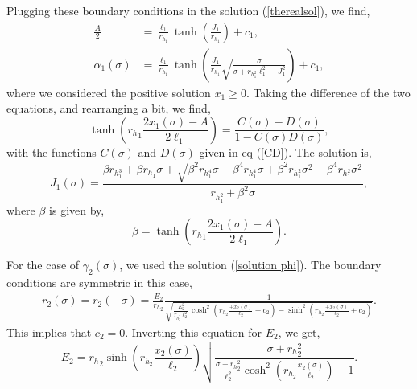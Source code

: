 Plugging these boundary conditions in the solution (\ref{therealsol}), we find,
\begin{align}
    \frac{A}{2} &= \frac{\ell_1}{r_h_1}\tanh\left(\frac{J_1}{r_h_1}\right) + c_1,\\
    \alpha_1(\sigma) &= \frac{\ell_1}{r_h_1}\tanh\left(\frac{J_1}{r_h_1}\sqrt{\frac{\sigma}{\sigma+r_h_1^2\ell_1^2-J_1^2}}\right) + c_1,
\end{align}
where we considered the positive solution $x_1\geq0$. Taking the difference of the two equations, and rearranging a bit, we find,
\begin{equation}
    \tanh \left( {r_h}_1 \frac{2x_1(\sigma) - A}{2\ell_1}\right) = \frac{C(\sigma)-D(\sigma)}{1-C(\sigma)D(\sigma)},
\end{equation}
with the functions $C(\sigma)$ and $D(\sigma)$ given in eq (\ref{CD}). The solution is,
\begin{equation}
    J_1(\sigma) = \frac{\beta r_h_1^3 + \beta r_h_1 \sigma + \sqrt{
\beta^2 r_h_1^4 \sigma - \beta^4 r_h_1^4 \sigma + \beta^2 r_h_1^2 \sigma^2 - 
  \beta^4 r_h_1^2 \sigma^2}}{r_h_1^2 + \beta^2 \sigma},
\end{equation}
where $\beta$ is given by,
\begin{equation}
    \beta = \tanh\left( {r_h}_1 \frac{2x_1(\sigma) - A}{2\ell_1}\right).
\end{equation}

For the case of $\gamma_2(\sigma)$, we used the solution (\ref{solution phi}). The boundary conditions are symmetric in this case,
\begin{align}
    r_2(\sigma) = r_2(-\sigma) = \frac{E_2}{{r_h}_2}\frac{1}{\sqrt{\frac{E_2^2}{r_h_2^2\ell_2^2}\cosh^2\left(r_h_2\frac{\pm x_2(\sigma)}{\ell_2}+c_2\right)-\sinh^2\left(r_h_2\frac{\pm x_2(\sigma)}{\ell_2}+c_2\right)}}.
\end{align}
This implies that $c_2=0$. Inverting this equation for $E_2$, we get,
\begin{equation}
    E_2 = {r_h}_2\sinh\left(r_h_2\frac{ x_2(\sigma)}{\ell_2}\right) \sqrt{\frac{\sigma+{r_h}_2^2}{\frac{\sigma+{r_h}_2^2}{\ell_2^2}\cosh^2\left(r_h_2\frac{ x_2(\sigma)}{\ell_2}\right)-1}}.
\end{equation}